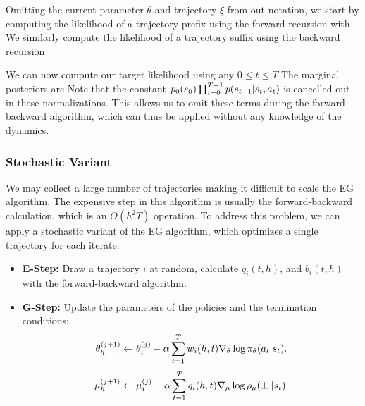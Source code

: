 Omitting the current parameter $\theta$ and trajectory $\xi$ from out notation, we start by computing the likelihood of a trajectory prefix
using the forward recursion
with
We similarly compute the likelihood of a trajectory suffix
using the backward recursion

We can now compute our target likelihood using any $0\le t\le T$
The marginal posteriors are
Note that the constant $p_0(s_0) \prod_{t=0}^{T-1} p(s_{t+1} \vert s_t, a_t)$ is cancelled out in these normalizations. This allows us to omit these terms during the forward-backward algorithm, which can thus be applied without any knowledge of the dynamics.


\subsubsection{Stochastic Variant}
We may collect a large number of trajectories making it difficult to scale the EG algorithm.
The expensive step in this algorithm is usually the forward-backward calculation, which is an $O(h^2T)$ operation.
To address this problem, we can apply a stochastic variant of the EG algorithm, which optimizes a single trajectory for each iterate:
\begin{itemize}
    \item \textbf{E-Step: } Draw a trajectory $i$ at random, calculate $q_i(t,h)$, and $b_i(t,h)$ with the forward-backward algorithm.
   \item \textbf{G-Step: } Update the parameters of the policies and the termination conditions:
    \[
\theta_h^{(j+1)} \leftarrow \theta_i^{(j)} - \alpha  \sum_{t=1}^{T} w_i(h,t) \nabla_\theta \log \pi_\theta(a_t \vert s_t).
\]
\[
\mu_h^{(j+1)} \leftarrow \mu_i^{(j)} - \alpha \sum_{t=1}^{T} q_i(h,t) \nabla_\mu \log \rho_\mu(\perp \vert s_t).
\]
\end{itemize}


